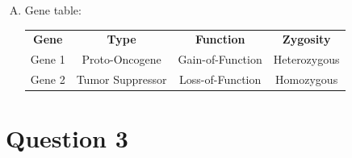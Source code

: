 \documentclass{article}
\begin{document}
\begin{enumerate}[A.]
    \item Gene table:
        \begin{center}
            \begin{tabular}{ c c c c }
                \textbf{Gene} & \textbf{Type} & \textbf{Function} &
                \textbf{ Zygosity } \\
                Gene 1 & Proto-Oncogene & Gain-of-Function & Heterozygous \\
                Gene 2 & Tumor Suppressor & Loss-of-Function & Homozygous 
            \end{tabular}
        \end{center}
\end{enumerate}

\section*{ Question 3 }
\end{document}
